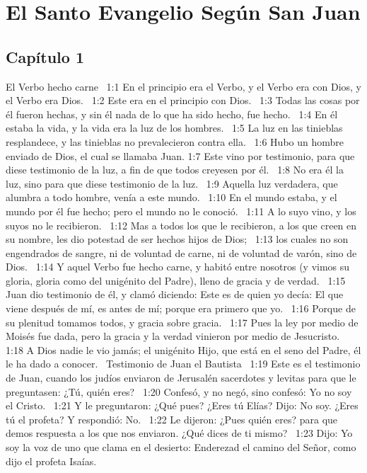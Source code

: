 \chapter{El Santo Evangelio Según San Juan}

\section*{Capítulo 1 }
El Verbo hecho carne  
1:1 En el principio era el Verbo, y el Verbo era con Dios, y el Verbo era Dios.  
1:2 Este era en el principio con Dios.  
1:3 Todas las cosas por él fueron hechas, y sin él nada de lo que ha sido hecho, fue hecho.  
1:4 En él estaba la vida, y la vida era la luz de los hombres.  
1:5 La luz en las tinieblas resplandece, y las tinieblas no prevalecieron contra ella.  
1:6 Hubo un hombre enviado de Dios, el cual se llamaba Juan. 
1:7 Este vino por testimonio, para que diese testimonio de la luz, a fin de que todos creyesen por él.  
1:8 No era él la luz, sino para que diese testimonio de la luz.  
1:9 Aquella luz verdadera, que alumbra a todo hombre, venía a este mundo.  
1:10 En el mundo estaba, y el mundo por él fue hecho; pero el mundo no le conoció.  
1:11 A lo suyo vino, y los suyos no le recibieron.  
1:12 Mas a todos los que le recibieron, a los que creen en su nombre, les dio potestad de ser hechos hijos de Dios;  
1:13 los cuales no son engendrados de sangre, ni de voluntad de carne, ni de voluntad de varón, sino de Dios.  
1:14 Y aquel Verbo fue hecho carne, y habitó entre nosotros (y vimos su gloria, gloria como del unigénito del Padre), lleno de gracia y de verdad.  
1:15 Juan dio testimonio de él, y clamó diciendo: Este es de quien yo decía: El que viene después de mí, es antes de mí; porque era primero que yo.  
1:16 Porque de su plenitud tomamos todos, y gracia sobre gracia.  
1:17 Pues la ley por medio de Moisés fue dada, pero la gracia y la verdad vinieron por medio de Jesucristo.  
1:18 A Dios nadie le vio jamás; el unigénito Hijo, que está en el seno del Padre, él le ha dado a conocer.  
Testimonio de Juan el Bautista   
1:19 Este es el testimonio de Juan, cuando los judíos enviaron de Jerusalén sacerdotes y levitas para que le preguntasen: ¿Tú, quién eres?  
1:20 Confesó, y no negó, sino confesó: Yo no soy el Cristo.  
1:21 Y le preguntaron: ¿Qué pues? ¿Eres tú Elías? Dijo: No soy. ¿Eres tú el profeta? Y respondió: No.  
1:22 Le dijeron: ¿Pues quién eres? para que demos respuesta a los que nos enviaron. ¿Qué dices de ti mismo?  
1:23 Dijo: Yo soy la voz de uno que clama en el desierto: Enderezad el camino del Señor, como dijo el profeta Isaías. 
